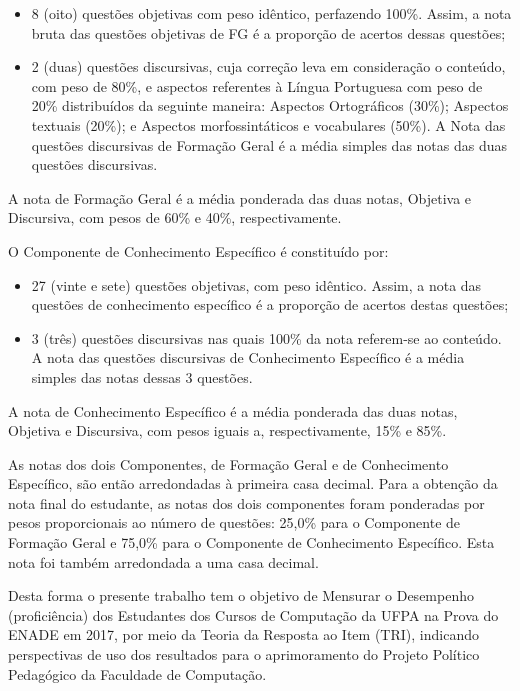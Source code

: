 \documentclass[12pt]{article}
\begin{document}
\begin{itemize}
\item 8 (oito) questões objetivas com peso idêntico, perfazendo 100\%. Assim, a nota bruta das questões objetivas de FG é a proporção de acertos dessas questões; 
\item 2 (duas) questões discursivas, cuja correção leva em consideração o conteúdo, com peso de 80\%, e aspectos referentes à Língua Portuguesa com peso de 20\% distribuídos da seguinte maneira: Aspectos Ortográficos (30\%); Aspectos textuais (20\%); e Aspectos morfossintáticos e vocabulares (50\%). A Nota das questões discursivas de Formação Geral é a média simples das notas das duas questões discursivas.
\end{itemize}


A nota de Formação Geral é a média ponderada das duas notas, Objetiva e Discursiva, com pesos de 60\% e 40\%, respectivamente.

O Componente de Conhecimento Específico é constituído por: 

\begin{itemize}
\item 27 (vinte e sete) questões objetivas, com peso idêntico. Assim, a nota das questões de conhecimento específico é a proporção de acertos destas questões; 
\item 3 (três) questões discursivas nas quais 100\% da nota referem-se ao conteúdo. A nota das questões discursivas de Conhecimento Específico é a média simples das notas dessas 3 questões. 
\end{itemize}

\newpage
A nota de Conhecimento Específico é a média ponderada das duas notas, Objetiva e Discursiva, com pesos iguais a, respectivamente, 15\% e 85\%.

As notas dos dois Componentes, de Formação Geral e de Conhecimento Específico, são então arredondadas à primeira casa decimal. Para a obtenção da nota final do estudante, as notas dos dois componentes foram ponderadas por pesos proporcionais ao número de questões: 25,0\% para o Componente de Formação Geral e 75,0\% para o Componente de Conhecimento Específico. Esta nota foi também arredondada a uma casa decimal.


Desta forma o presente trabalho tem o objetivo de Mensurar o Desempenho (proficiência) dos Estudantes dos Cursos de Computação da UFPA na Prova do ENADE em 2017, por meio da Teoria da Resposta ao Item (TRI), indicando perspectivas de uso dos resultados para o aprimoramento do Projeto Político Pedagógico da Faculdade de Computação.
\end{document}
